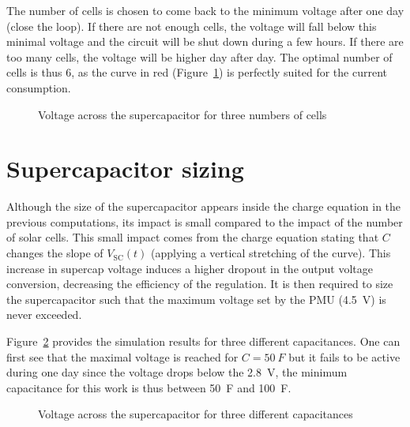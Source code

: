 \documentclass{EPL-master-thesis-covers-EN}
\newcommand{\te}[1]{\textrm{#1}}
\begin{document}
The number of cells is chosen to come back to the minimum voltage after one day (close the loop). If there are not enough cells, the voltage will fall below this minimal voltage and the circuit will be shut down during a few hours. If there are too many cells, the voltage will be higher day after day. The optimal number of cells is thus 6, as the curve in red (Figure~\ref{fig:Supercap_voltage}) is perfectly suited for the current consumption.

\begin{figure}[H]
    \centering
    
    \caption{Voltage across the supercapacitor for three numbers of cells}
    \label{fig:Supercap_voltage}
\end{figure}

\section{Supercapacitor sizing}
\label{supercap_sizing}

Although the size of the supercapacitor appears inside the charge equation in the previous computations, its impact is small compared to the impact of the number of solar cells. This small impact comes from the charge equation stating that $C$ changes the slope of $V_\te{SC}(t)$ (applying a vertical stretching of the curve). This increase in supercap voltage induces a higher dropout in the output voltage conversion, decreasing the efficiency of the regulation. It is then required to size the supercapacitor such that the maximum voltage set by the PMU (\SI{4.5}{V}) is never exceeded.

Figure~\ref{fig:Supercap_voltage_C} provides the simulation results for three different capacitances. One can first see that the maximal voltage is reached for $C = \SI{50}{F}$ but it fails to be active during one day since the voltage drops below the \SI{2.8}{V}, the minimum capacitance for this work is thus between \SI{50}{F} and \SI{100}{F}.

\begin{figure}[H]
    \centering
    
    \caption{Voltage across the supercapacitor for three different capacitances}
    \label{fig:Supercap_voltage_C}
\end{figure}

\end{document}
